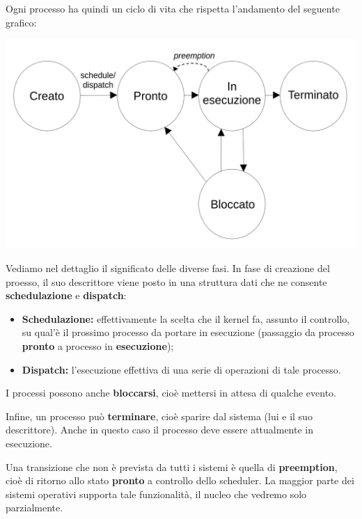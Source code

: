 \documentclass[a4paper,11pt]{article}
\begin{document}
\noindent
\begin{minipage}{\textwidth}
Ogni processo ha quindi un ciclo di vita che rispetta l'andamento del seguente grafico:
\begin{center}
	\includegraphics[scale=0.3]{../figures/schema_proc.png}
\end{center}
\end{minipage}

Vediamo nel dettaglio il significato delle diverse fasi.
In fase di creazione del proesso, il suo descrittore viene posto in una struttura dati che ne consente \textbf{schedulazione} e \textbf{dispatch}:
\begin{itemize}
	\item \textbf{Schedulazione:} effettivamente la scelta che il kernel fa, assunto il controllo, su qual'è il prossimo processo da portare in esecuzione (passaggio da processo \textbf{pronto} a processo in \textbf{esecuzione});
	\item \textbf{Dispatch:} l'esecuzione effettiva di una serie di operazioni di tale processo. 
\end{itemize}

I processi possono anche \textbf{bloccarsi}, cioè mettersi in attesa di qualche evento. 

Infine, un processo può \textbf{terminare}, cioè sparire dal sistema (lui e il suo descrittore).
Anche in questo caso il processo deve essere attualmente in esecuzione.

Una transizione che non è prevista da tutti i sistemi è quella di \textbf{preemption}, cioè di ritorno allo stato \textbf{pronto} a controllo dello scheduler.
La maggior parte dei sistemi operativi supporta tale funzionalità, il nucleo che vedremo solo parzialmente.
\end{document}
